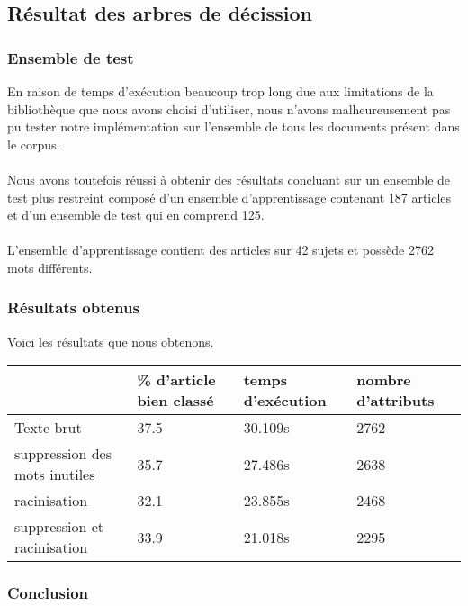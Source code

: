 \subsection{Résultat des arbres de décission}

\subsubsection{Ensemble de test}

En raison de temps d'exécution beaucoup trop long due aux limitations de la bibliothèque que nous avons choisi d’utiliser, nous n’avons malheureusement pas pu tester notre implémentation sur l’ensemble de tous les documents présent dans le corpus.
\paragraph{}
Nous avons toutefois réussi à obtenir des résultats concluant sur un ensemble de test plus restreint composé d’un ensemble d’apprentissage contenant 187 articles et d’un ensemble de test qui en comprend 125.
\paragraph{}
L’ensemble d’apprentissage contient des articles sur 42 sujets et possède 2762 mots différents.

\subsubsection{Résultats obtenus}

Voici les résultats que nous obtenons.

\begin{center}
    \begin{tabular}{| l | p{2cm} | p{2cm} | p{2cm} |}
    \hline
    & \% d'article bien classé & temps d'exécution & nombre d'attributs \\ \hline
    Texte brut & 37.5 & 30.109s & 2762 \\ \hline
    suppression des mots inutiles & 35.7 & 27.486s & 2638 \\ \hline
	racinisation & 32.1 & 23.855s & 2468 \\ \hline
    suppression et racinisation & 33.9 & 21.018s & 2295 \\
    \hline
    \end{tabular}
\end{center}

\subsubsection{Conclusion}

